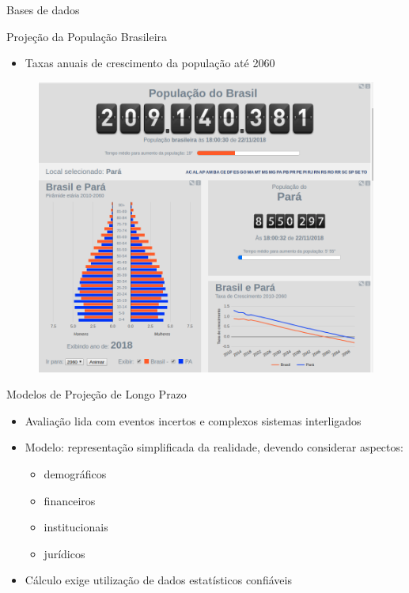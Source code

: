 \begin{frame}{Bases de dados}
  \begin{block}{Projeção da População Brasileira}
    \begin{itemize}
      \item Taxas anuais de crescimento da população até 2060
    \end{itemize}
  \end{block}
  \begin{figure}[h]
  	\begin{center}
      \includegraphics [scale=0.23]{./Figures/ibge-pop}
  	\end{center}
  \end{figure}
\end{frame}

\begin{frame}{Modelos de Projeção de Longo Prazo}
  \begin{block}{}
    \begin{itemize}
      \item Avaliação lida com eventos incertos e complexos sistemas
      interligados
      \item Modelo: representação simplificada da realidade, devendo
      considerar aspectos:
      \begin{itemize}
        \item demográficos
        \item financeiros
        \item institucionais
        \item jurídicos
      \end{itemize}
      \item Cálculo exige utilização de dados estatísticos confiáveis
    \end{itemize}
  \end{block}
\end{frame}

